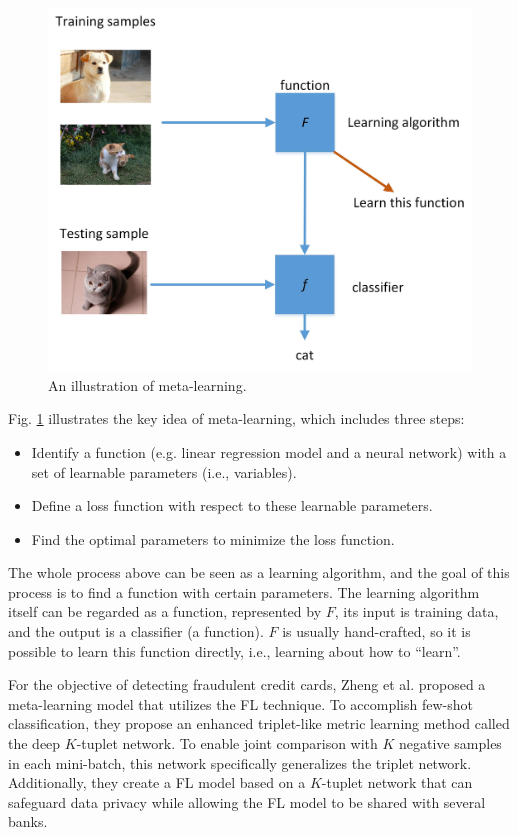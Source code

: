 \documentclass[10pt,journal,compsoc]{IEEEtran}
\begin{document}
\begin{figure}[htbp]
\centering
\setlength{\abovecaptionskip}{-0.2cm}
\includegraphics[scale=0.6]{meta.jpg}
\caption{An illustration of meta-learning.}
\label{meta-learning}
\end{figure}
\vspace{-0.2cm}

Fig. \ref{meta-learning} illustrates the key idea of meta-learning, which includes three steps: 
\begin{itemize}
\item Identify a function (e.g. linear regression model and a neural network) with a set of learnable parameters (i.e., variables).
\item Define a loss function with respect to these learnable parameters.
\item Find the optimal parameters to minimize the loss function.
\end{itemize}

The whole process above can be seen as a learning algorithm, and the goal of this process is to find a function with certain parameters. The learning algorithm itself can be regarded as a function, represented by $ F $, its input is training data, and the output is a classifier (a function). $ F $ is usually hand-crafted, so it is possible to learn this function directly, i.e., learning about how to ``learn''.

For the objective of detecting fraudulent credit cards, Zheng et al. \cite{zheng2021federated} proposed a meta-learning model that utilizes the FL technique. To accomplish few-shot classification, they propose an enhanced triplet-like metric learning method called the deep $ K $-tuplet network. To enable joint comparison with $ K $ negative samples in each mini-batch, this network specifically generalizes the triplet network. Additionally, they create a FL model based on a $ K $-tuplet network that can safeguard data privacy while allowing the FL model to be shared with several banks. 
\end{document}
